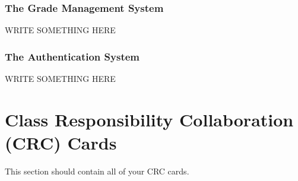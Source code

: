 \documentclass[]{article}
\begin{document}
\subsubsection{The Grade Management System}
WRITE SOMETHING HERE

\subsubsection{The Authentication System} 
WRITE SOMETHING HERE


\section{Class Responsibility Collaboration (CRC) Cards}
\label{sec:class_responsibility_collaboration_crc_cards}
This section should contain all of your CRC cards.
\end{document}
